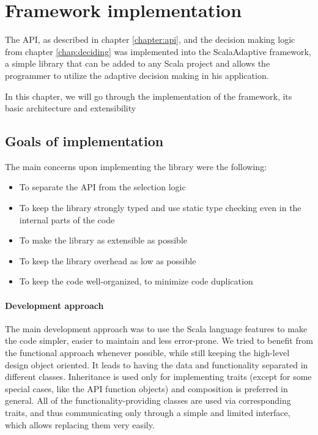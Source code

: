 \chapter{Framework implementation}
\label{chap:implementation}

The API, as described in chapter \ref{chapter:api}, and the decision making logic from chapter \ref{chap:deciding} was implemented into the ScalaAdaptive framework, a simple library that can be added to any Scala project and allows the programmer to utilize the adaptive decision making in his application.

In this chapter, we will go through the implementation of the framework, its basic architecture and extensibility

\section{Goals of implementation}

The main concerns upon implementing the library were the following:

\begin{itemize}
	\item To separate the API from the selection logic
	\item To keep the library strongly typed and use static type checking even in the internal parts of the code
	\item To make the library as extensible as possible
	\item To keep the library overhead as low as possible
	\item To keep the code well-organized, to minimize code duplication
\end{itemize}

\subsubsection{Development approach}

The main development approach was to use the Scala language features to make the code simpler, easier to maintain and less error-prone. We tried to benefit from the functional approach whenever possible, while still keeping the high-level design object oriented. It leads to having the data and functionality separated in different classes. Inheritance is used only for implementing traits (except for some special cases, like the API function objects) and composition is preferred in general. All of the functionality-providing classes are used via corresponding traits, and thus communicating only through a simple and limited interface, which allows replacing them very easily.

